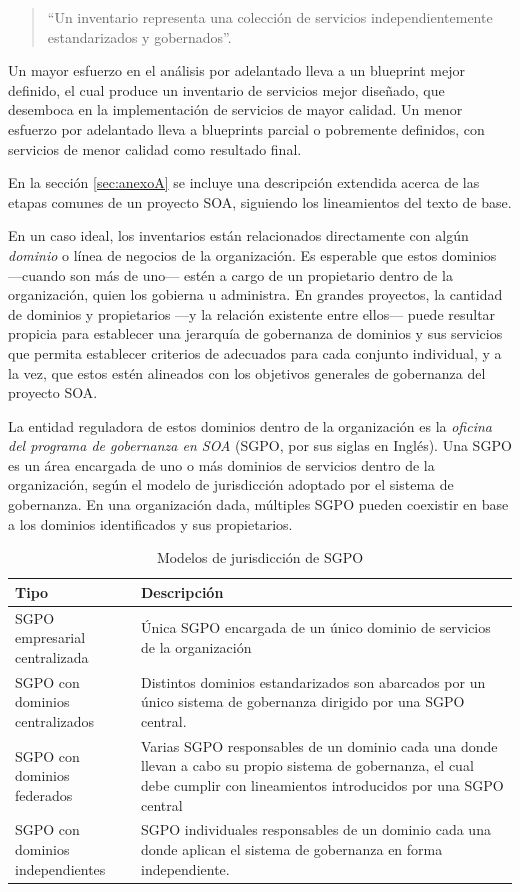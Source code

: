 \documentclass[11pt]{article}
\begin{document}
		\begin{quote}
			``Un inventario representa una colección de servicios independientemente estandarizados y gobernados''. \cite{Erl:2011:SGG:1983453}
		\end{quote}

		Un mayor esfuerzo en el análisis por adelantado lleva a un blueprint mejor definido, el cual produce un inventario de servicios mejor diseñado, que desemboca en la implementación de servicios de mayor calidad. Un menor esfuerzo por adelantado lleva a blueprints parcial o pobremente definidos, con servicios de menor calidad como resultado final.

		En la sección \ref{sec:anexoA} se incluye una descripción extendida acerca de las etapas comunes de un proyecto SOA, siguiendo los lineamientos del texto de base.

		En un caso ideal, los inventarios están relacionados directamente con algún \emph{dominio} o línea de negocios de la organización. Es esperable que estos dominios —cuando son más de uno— estén a cargo de un propietario dentro de la organización, quien los gobierna u administra. En grandes proyectos, la cantidad de dominios y propietarios —y la relación existente entre ellos— puede resultar propicia para establecer una jerarquía de gobernanza de dominios y sus servicios que permita establecer criterios de adecuados para cada conjunto individual, y a la vez, que estos estén alineados con los objetivos generales de gobernanza del proyecto SOA.

		La entidad reguladora de estos dominios dentro de la organización es la \emph{oficina del programa de gobernanza en SOA} (SGPO, por sus siglas en Inglés). Una SGPO es un área encargada de uno o más dominios de servicios dentro de la organización, según el modelo de jurisdicción adoptado por el sistema de gobernanza. En una organización dada, múltiples SGPO pueden coexistir en base a los dominios identificados y sus propietarios.

		\begin{table}[h]
			\begin{tabular}{p{0.25\linewidth} | p{0.75\linewidth}}
				\textbf{Tipo} & \textbf{Descripción} \\
				\hline
				SGPO empresarial centralizada & Única SGPO encargada de un único dominio de servicios de la organización\\
				\hline
				SGPO con dominios centralizados & Distintos dominios estandarizados son abarcados por un único sistema de gobernanza dirigido por una SGPO central.\\
				\hline
				SGPO con dominios federados & Varias SGPO responsables de un dominio cada una donde llevan a cabo su propio sistema de gobernanza, el cual debe cumplir con lineamientos introducidos por una SGPO central\\
				\hline
				SGPO con dominios independientes & SGPO individuales responsables de un dominio cada una donde aplican el sistema de gobernanza en forma independiente.\\
				\hline
			\end{tabular}
			\caption{Modelos de jurisdicción de SGPO}
			\label{tabla:modelos_sgpo}
		\end{table}
\end{document}
